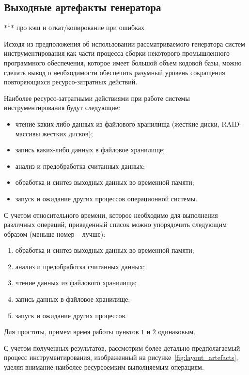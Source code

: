 \subsection{Выходные артефакты генератора}

***
про кэш и откат/копирование при ошибках

Исходя из предположения об использовании рассматриваемого генератора систем инструментирования как части процесса сборки некоторого промышленного программного обеспечения, которое имеет большой объем кодовой базы, можно сделать вывод о необходимости обеспечить разумный уровень сокращения повторяющихся ресурсо-затратных действий.

Наиболее ресурсо-затратными действиями при работе системы инструментирования будут следующие:
\begin{itemize}
  \item чтение каких-либо данных из файлового хранилища (жесткие диски, RAID-массивы жестких дисков);
  \item запись каких-либо данных в файловое хранилище;
  \item анализ и предобработка считанных данных;
  \item обработка и синтез выходных данных во временной памяти;
  \item запуск и ожидание других процессов операционной системы.
\end{itemize}

С учетом относительного времени, которое необходимо для выполнения различных операций, приведенный список можно упорядочить следующим образом (меньше номер -- лучше):
\begin{enumerate}
  \item обработка и синтез выходных данных во временной памяти;
  \item анализ и предобработка считанных данных;
  \item чтение данных из файлового хранилища;
  \item запись данных в файловое хранилище;
  \item запуск и ожидание других процессов.
\end{enumerate}

Для простоты, примем время работы пунктов $1$ и $2$ одинаковым.

С учетом полученных результатов, рассмотрим более детально предполагаемый процесс инструментирования, изображенный на рисунке~\ref{fig:layout_artefacts}, уделяя внимание наиболее ресурсоемким выполняемым операциям.

